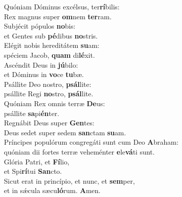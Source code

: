 \evenverse Quóniam Dóminus excélsus, ter\textbf{rí}bilis:~\*\\
\evenverse Rex magnus super \textbf{om}nem \textbf{ter}ram.\\
\oddverse Subjécit pópulos \textbf{no}bis:~\*\\
\oddverse et Gentes sub \textbf{pé}dibus \textbf{no}stris.\\
\evenverse Elégit nobis hereditátem \textbf{su}am:~\*\\
\evenverse spéciem Jacob, \textbf{quam} di\textbf{lé}xit.\\
\oddverse Ascéndit Deus in \textbf{jú}bilo:~\*\\
\oddverse et Dóminus in \textbf{vo}ce \textbf{tu}bæ.\\
\evenverse Psállite Deo nostro, \textbf{psál}lite:~\*\\
\evenverse psállite Regi \textbf{no}stro, \textbf{psál}lite.\\
\oddverse Quóniam Rex omnis terræ \textbf{De}us:~\*\\
\oddverse psállite \textbf{sa}pi\textbf{én}ter.\\
\evenverse Regnábit Deus super \textbf{Gen}tes:~\*\\
\evenverse Deus sedet super sedem \textbf{san}ctam \textbf{su}am.\\
\oddverse Príncipes populórum congregáti sunt cum Deo \textbf{A}braham:~\*\\
\oddverse quóniam dii fortes terræ veheménter \textbf{e}le\textbf{vá}ti sunt.\\
\evenverse Glória Patri, et \textbf{Fí}lio,~\*\\
\evenverse et Spi\textbf{rí}tui \textbf{San}cto.\\
\oddverse Sicut erat in princípio, et nunc, et \textbf{sem}per,~\*\\
\oddverse et in sǽcula sæcu\textbf{ló}rum. \textbf{A}men.\\
